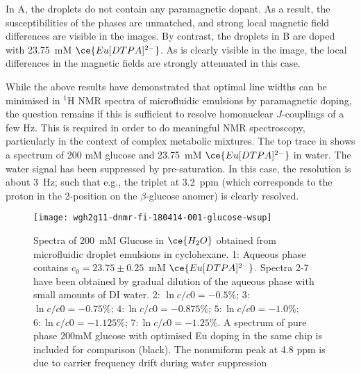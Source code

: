 In A, the droplets do not contain any paramagnetic dopant. As a result, the
susceptibilities of the phases are unmatched, and strong local magnetic field differences
are visible in the images. By contrast, the droplets in B are doped with 23.75~mM
$\ce{Eu[DTPA]^{2-}}$. As is clearly visible in the image, the local differences in the magnetic
fields are strongly attenuated in this case.

While the above results have demonstrated that optimal line widths can be minimised in $^1$H NMR
spectra of microfluidic emulsions by paramagnetic doping,
the question remains if this is sufficient to resolve homonuclear
$J$-couplings of a few Hz. This is required in order to do meaningful NMR spectroscopy,
particularly in the context of complex metabolic mixtures.
The top trace in  shows a spectrum of 200 mM glucose
and 23.75~mM $\ce{Eu[DTPA]^{2-}}$ in water. The water signal has been suppressed by pre-saturation.
In this case, the resolution is about 3~Hz; such that e.g., the triplet at 3.2~ppm (which corresponds
to the proton in the 2-position on the $\beta$-glucose anomer) is clearly resolved.

\begin{figure}
\begin{center}
	\texttt{[image: wgh2g11-dnmr-fi-180414-001-glucose-wsup]}
\end{center}
\caption{Spectra of 200~mM Glucose in $\ce{H_2O}$ obtained from microfluidic droplet emulsions in
	cyclohexane. 1: Aqueous phase contains $c_0=23.75\pm0.25$~mM $\ce{Eu[DTPA]^{2-}}$. Spectra 2-7
	have been obtained by gradual dilution of the aqueous phase with small amounts of DI water.
	2: $\ln c/c0 = -0.5\%$; 3: $\ln c/c0 = -0.75\%$; $4: \ln c/c0 = -0.875\%$;
	$5: \ln c/c0 = -1.0\%$; $6: \ln c/c0 = -1.125\%$; $7: \ln c/c0 = -1.25\%$. A spectrum of pure phase 200mM glucose
	with optimised Eu doping in the same chip is included for comparison (black). The nonuniform peak at 4.8 ppm is due to carrier frequency drift during water suppression }
\label{fig:glucose-dilution}
\end{figure}

